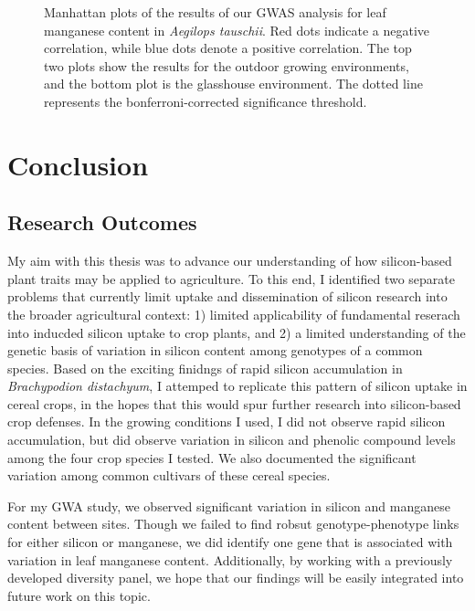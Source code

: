 \documentclass[12pt, letterpaper, ]{report}
\begin{document}
{\begin{figure}[h]
\begin{subfigure}[b]{\textwidth}
                \label{Fig:gh_mn_peak}
        \end{subfigure}
        \caption{Manhattan plots of the results of our GWAS analysis for leaf manganese content in \textit{Aegilops tauschii}. Red dots indicate a negative correlation, while blue dots denote a positive correlation. The top two plots show the results for the outdoor growing environments, and the bottom plot is the glasshouse environment. The dotted line represents the bonferroni-corrected significance threshold.}
        \label{Fig:mn_peak_plot_old}
\end{figure}
}

\clearpage

\chapter{Conclusion}
\section{Research Outcomes}

My aim with this thesis was to advance our understanding of how silicon-based plant traits may be applied to agriculture. To this end, I identified two separate problems that currently limit uptake and dissemination of silicon research into the broader agricultural context: 1) limited applicability of fundamental reserach into inducded silicon uptake to crop plants, and 2) a limited understanding of the genetic basis of variation in silicon content among genotypes of a common species. Based on the exciting finidngs of rapid silicon accumulation in \textit{Brachypodion distachyum}, I attemped to replicate this pattern of silicon uptake in cereal crops, in the hopes that this would spur further research into silicon-based crop defenses. In the growing conditions I used, I did not observe rapid silicon accumulation, but did observe variation in silicon and phenolic compound levels among the four crop species I tested. We also documented the significant variation among common cultivars of these cereal species.

For my GWA study, we observed significant variation in silicon and manganese content between sites. Though we failed to find robsut genotype-phenotype links for either silicon or manganese, we did identify one gene that is associated with variation in leaf manganese content. Additionally, by working with a previously developed diversity panel, we hope that our findings will be easily integrated into future work on this topic.
\end{document}
